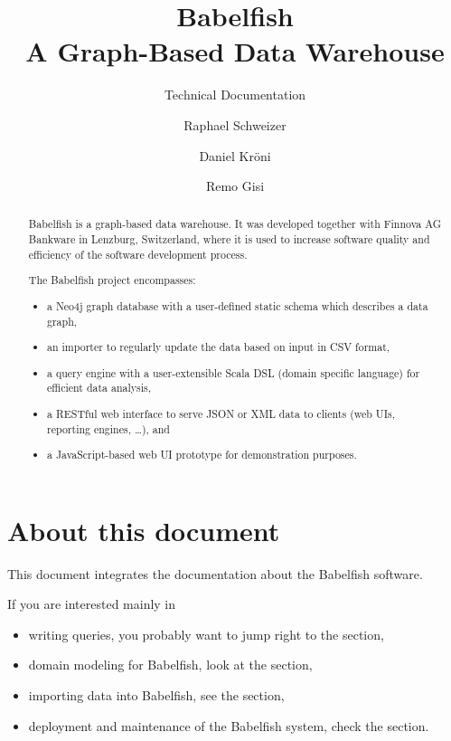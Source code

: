 
\setlength{\grammarindent}{10em}

\newcommand{\nt}[1]{$\left<\right.${\slshape#1}$\left.\right>$} %
\newcommand{\tl}[1]{{\ttfamily#1}} %
\renewcommand{\^}{\ensuremath{\hat{}}}
\renewcommand{\~}{\ensuremath{\sim}}

	
\title{Babelfish \\ A Graph-Based Data Warehouse}
\author{Raphael Schweizer \and Daniel Kröni \and Remo Gisi}
\subtitle{Technical Documentation}
\maketitle


\begin{abstract}
Babelfish is a graph-based data warehouse.
It was developed together with Finnova AG Bankware in Lenzburg, Switzerland, where it is used to increase software quality and efficiency of the software development process.

The Babelfish project encompasses:
\begin{itemize}
\item a Neo4j graph database with a user-defined static schema which describes a data graph,
\item an importer to regularly update the data based on input in CSV format,
\item a query engine with a user-extensible Scala DSL (domain specific language) for efficient data analysis,
\item a RESTful web interface to serve JSON or XML data to clients (web UIs, reporting engines, \ldots), and
\item a JavaScript-based web UI prototype for demonstration purposes.
\end{itemize}
\end{abstract}

\tableofcontents\thispagestyle{plain}

\frontmatter

\printglossary[type=\acronymtype,style=list]

\section*{About this document}
This document integrates the documentation about the Babelfish software.

If you are interested mainly in 
\begin{itemize}
\item writing queries, you probably want to jump right to the  section,
\item domain modeling for Babelfish, look at the  section,
\item importing data into Babelfish, see the  section,
\item deployment and maintenance of the Babelfish system, check the  section.
\end{itemize}


